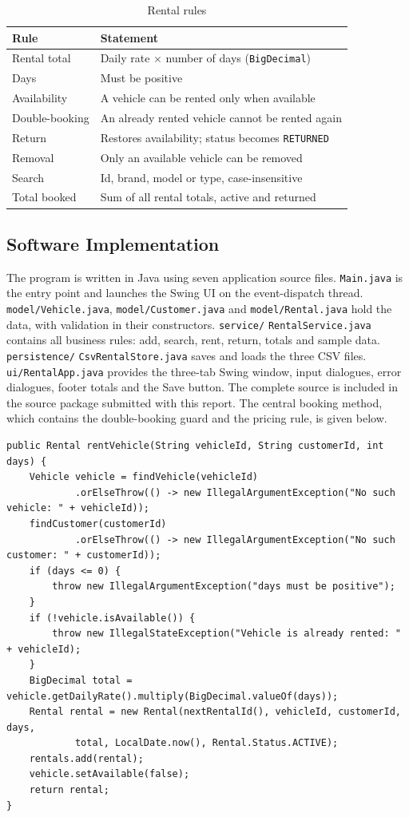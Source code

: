 \documentclass[11pt,a4paper]{article}
\begin{document}
\begin{table}[h]
\centering
\caption{Rental rules}
\begin{tabular}{ll}
\toprule
Rule & Statement \\
\midrule
Rental total & Daily rate $\times$ number of days (\texttt{BigDecimal}) \\
Days & Must be positive \\
Availability & A vehicle can be rented only when available \\
Double-booking & An already rented vehicle cannot be rented again \\
Return & Restores availability; status becomes \texttt{RETURNED} \\
Removal & Only an available vehicle can be removed \\
Search & Id, brand, model or type, case-insensitive \\
Total booked & Sum of all rental totals, active and returned \\
\bottomrule
\end{tabular}
\end{table}

\subsection{Software Implementation}

The program is written in Java using seven application source files.
\texttt{Main.java} is the entry point and launches the Swing UI on
the event-dispatch thread. \texttt{model/Vehicle.java},
\texttt{model/Customer.java} and \texttt{model/Rental.java} hold
the data, with validation in their constructors. \texttt{service/}
\texttt{RentalService.java} contains all business rules: add,
search, rent, return, totals and sample data. \texttt{persistence/}
\texttt{CsvRentalStore.java} saves and loads the three CSV files.
\texttt{ui/RentalApp.java} provides the three-tab Swing window,
input dialogues, error dialogues, footer totals and the Save button.
The complete source is included in the source package submitted with
this report. The central booking method, which contains the
double-booking guard and the pricing rule, is given below.

\begin{lstlisting}[caption={RentalService.rentVehicle -- the central booking method}]
public Rental rentVehicle(String vehicleId, String customerId, int days) {
    Vehicle vehicle = findVehicle(vehicleId)
            .orElseThrow(() -> new IllegalArgumentException("No such vehicle: " + vehicleId));
    findCustomer(customerId)
            .orElseThrow(() -> new IllegalArgumentException("No such customer: " + customerId));
    if (days <= 0) {
        throw new IllegalArgumentException("days must be positive");
    }
    if (!vehicle.isAvailable()) {
        throw new IllegalStateException("Vehicle is already rented: " + vehicleId);
    }
    BigDecimal total = vehicle.getDailyRate().multiply(BigDecimal.valueOf(days));
    Rental rental = new Rental(nextRentalId(), vehicleId, customerId, days,
            total, LocalDate.now(), Rental.Status.ACTIVE);
    rentals.add(rental);
    vehicle.setAvailable(false);
    return rental;
}
\end{lstlisting}
\end{document}
